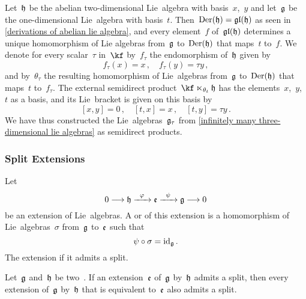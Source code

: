 \begin{example}
	Let~$\mathfrak{h}$ be the abelian two-dimensional Lie~algebra with basis~$x$,~$y$ and let~$\mathfrak{g}$ be the one-dimensional Lie~algebra with basis~$t$.
	Then~$\operatorname{Der}(\mathfrak{h}) = \mathfrak{gl}(\mathfrak{h})$ as seen in \cref{derivations of abelian lie algebra}, and every element~$f$ of~$\mathfrak{gl}(\mathfrak{h})$ determines a unique homomorphism of Lie algebras from~$\mathfrak{g}$ to~$\operatorname{Der}(\mathfrak{h})$ that maps~$t$ to~$f$.
	We denote for every scalar~$\tau$ in~$\kf$ by~$f_\tau$ the endomorphism of~$\mathfrak{h}$ given by
	\[
		f_\tau(x) = x \,,
		\quad
		f_\tau(y) = \tau y \,,
	\]
	and by~$\theta_\tau$ the resulting homomorphism of Lie~algebras from~$\mathfrak{g}$ to~$\operatorname{Der}(\mathfrak{h})$ that maps~$t$ to~$f_\tau$.
	The external semidirect product~${\kf} \ltimes_{\theta_t} \hlie$ has the elements~$x$,~$y$,~$t$ as a basis, and its Lie~bracket is given on this basis by
	\[
		[x,y] = 0 \,,
		\quad
		[t,x] = x \,,
		\quad
		[t,y] =  \tau y \,.
	\]
	We have thus constructed the Lie~algebras~$\mathfrak{g}_\tau$ from \cref{infinitely many three-dimensional lie algebras} as semidirect products.
\end{example}

\subsubsection{Split Extensions}

\begin{definition}
	Let
	\[
		0
		\to
		\hlie
		\xto{\varphi}
		\elie
		\xto{\psi}
		\glie
		\to
		0
	\]
	be an extension of Lie~algebras.
	A  or  of this extension is a homomorphism of Lie~algebras~$\sigma$ from~$\mathfrak{g}$ to~$\mathfrak{e}$ such that
	\[
		\psi \circ \sigma
		=
		\mathrm{id}_{\mathfrak{g}} \,.
	\]
	The extension  if it admits a split.
\end{definition}


\begin{lemma}
	\label{having a section is invariant under equivalence of extensions}
	Let~$\mathfrak{g}$ and~$\mathfrak{h}$ be two~\liealgebras{$\kf$}.
	If an extension~$\mathfrak{e}$ of~$\mathfrak{g}$ by~$\mathfrak{h}$ admits a split, then every extension of~$\mathfrak{g}$ by~$\mathfrak{h}$ that is equivalent to~$\mathfrak{e}$ also admits a split.
\end{lemma}


